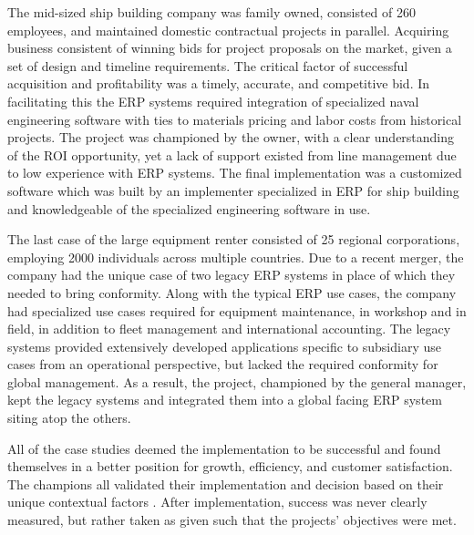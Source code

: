 \documentclass{article}
\begin{document}
The mid-sized ship building company was family owned, consisted of 260 employees, and maintained domestic contractual projects in parallel.
Acquiring business consistent of winning bids for project proposals on the market, given a set of design and timeline requirements.
The critical factor of successful acquisition and profitability was a timely, accurate, and competitive bid.
In facilitating this the ERP systems required integration of specialized naval engineering software with ties to materials pricing and labor costs from historical projects.
The project was championed by the owner, with a clear understanding of the ROI opportunity, yet a lack of support existed from line management due to low experience with ERP systems.
The final implementation was a customized software which was built by an implementer specialized in ERP for ship building and knowledgeable of the specialized engineering software in use.

The last case of the large equipment renter consisted of 25 regional corporations, employing 2000 individuals across multiple countries.
Due to a recent merger, the company had the unique case of two legacy ERP systems in place of which they needed to bring conformity.
Along with the typical ERP use cases, the company had specialized use cases required for equipment maintenance, in workshop and in field, in addition to fleet management and international accounting.
The legacy systems provided extensively developed applications specific to subsidiary use cases from an operational perspective, but lacked the required conformity for global management.
As a result, the project, championed by the general manager, kept the legacy systems and integrated them into a global facing ERP system siting atop the others.

All of the case studies deemed the implementation to be successful and found themselves in a better position for growth, efficiency, and customer satisfaction.
The champions all validated their implementation and decision based on their unique contextual factors \cite{integrated_erp}.
After implementation, success was never clearly measured, but rather taken as given such that the projects' objectives were met.
\end{document}

